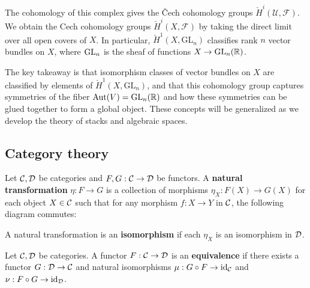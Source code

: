 \documentclass[12pt]{article}
\begin{document}
The cohomology of this complex gives the Čech cohomology groups $\check{H}^i(\mathcal{U}, \mathcal{F})$. We obtain the Cech cohomology groups $\check{H}^i(X, \mathcal{F})$ by taking the direct limit over all open covers of $X$. In particular, $\check{H}^1(X, \text{GL}_n)$ classifies rank $n$ vector bundles on $X$, where $\operatorname{GL}_n$ is the sheaf of functions $X \to \operatorname{GL}_n(\mathbb{R})$.

The key takeaway is that isomorphism classes of vector bundles on $X$ are classified by elements of $\check{H}^1(X, \text{GL}_n)$, and that this cohomology group captures symmetries of the fiber $\operatorname{Aut}(V) = \operatorname{GL}_n(\mathbb{R})$ and how these symmetries can be glued together to form a global object. These concepts will be generalized as we develop the theory of stacks and algebraic spaces.


\subsection{Category theory}
\begin{definition}
    Let $\cal C, \cal D$ be categories and $F,G: \cal C \to \cal D$ be functors. A \textbf{natural transformation} $\eta: F \to G$ is a collection of morphisms $\eta_X: F(X) \to G(X)$ for each object $X \in \cal C$ such that for any morphism $f: X \to Y$ in $\cal C$, the following diagram commutes:
    \begin{center}
    \end{center}
    A natural transformation is an \textbf{isomorphism} if each $\eta_X$ is an isomorphism in $\cal D$.
\end{definition}

\begin{definition}
    Let $\cal C, \cal D$ be categories. A functor $F: \cal C \to \cal D$ is an \textbf{equivalence} if there exists a functor $G: \cal D \to \cal C$ and natural isomorphisms $\mu: G \circ F \to \text{id}_{\cal C}$ and $\nu: F \circ G \to \text{id}_{\cal D}$.
\end{definition}
\end{document}
